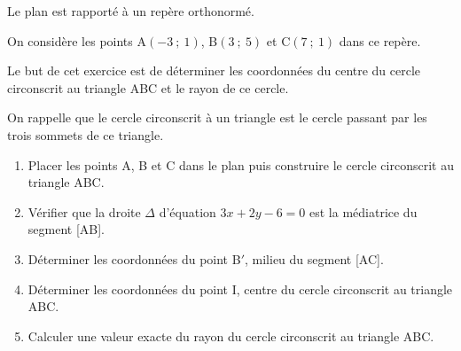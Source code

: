 \medskip

Le plan est rapporté à un repère orthonormé.

On considère les points A$(-3~;~1)$, B$(3~;~5)$ et C$(7~;~1)$ dans ce repère.

Le but de cet exercice est de déterminer les coordonnées du centre du cercle circonscrit au triangle ABC et le rayon de ce cercle.

On rappelle que le cercle circonscrit à un triangle est le cercle passant par les trois sommets de ce triangle.

\medskip

\begin{enumerate}
\item Placer les points A, B et C dans le plan puis construire le cercle circonscrit au triangle ABC.
\item Vérifier que la droite $\Delta$ d'équation $3x + 2y - 6 = 0$ est la médiatrice du segment [AB]. 
\item Déterminer les coordonnées du point B$'$, milieu du segment [AC].
\item Déterminer les coordonnées du point I, centre du cercle circonscrit au triangle ABC.
\item Calculer une valeur exacte du rayon du cercle circonscrit au triangle ABC.
\end{enumerate}
